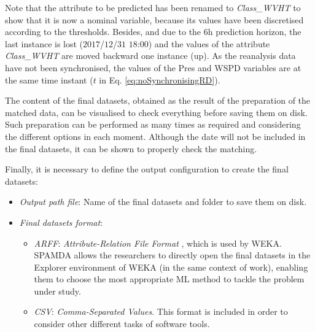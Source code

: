 \documentclass[energies,article,submit,moreauthors,pdftex]{Definitions/mdpi}
\begin{document}
\begin{itemize}
						Note that the attribute to be predicted has been renamed to \textit{Class\_WVHT} to show that it is now a nominal variable, because its values have been discretised according to the thresholds. Besides, and due to the $6$h prediction horizon, the last instance is lost ($2017$/$12$/$31$ $18$:$00$) and the values of the attribute \textit{Class\_WVHT} are moved backward one instance (up). As the reanalysis data have not been synchronised, the values of the Pres and WSPD variables are at the same time instant ($t$ in Eq. \ref{eq:noSynchronisingRD}).
						
					\end{itemize}
				
				The content of the final datasets, obtained as the result of the preparation of the matched data, can be visualised to check everything before saving them on disk. Such preparation can be performed as many times as required and considering the different options in each moment. Although the date will not be included in the final datasets, it can be shown to properly check the matching.
				
				Finally, it is necessary to define the output configuration to create the final datasets:			
				\begin{itemize}

					\item \textit{Output path file}: Name of the final datasets and folder to save them on disk.
						
					\item \textit{Final datasets format}:

						\begin{itemize}
						
							\item \textit{ARFF}: \textit{Attribute-Relation File Format} \cite{WEKA_ARFF}, which is used by WEKA. SPAMDA allows the researchers to directly open the final datasets in the Explorer environment of WEKA (in the same context of work), enabling them to choose the most appropriate ML method to tackle the problem under study.

							\item \textit{CSV}: \textit{Comma-Separated Values}. This format is included in order to consider other different tasks of software tools.
							
						\end{itemize}
					
				\end{itemize}
				
\end{document}

